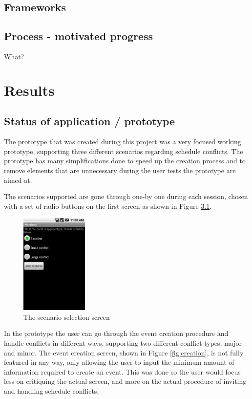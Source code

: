 \documentclass[]{report}
\begin{document}
\section{Frameworks}

\section{Process - motivated progress}

What?

\chapter{Results}

\section{Status of application / prototype}

The prototype that was created during this project was a very focused working
prototype, supporting three different scenarios regarding schedule
conflicts. The prototype has many simplifications done to speed up the creation
process and to remove elements that are unnecessary during the user tests the
prototype are aimed at.

The scenarios supported are gone through one-by one during each session, chosen
with a set of radio buttons on the first screen as shown in Figure
\ref{fig:scenario}.

\begin{figure}[htb]
  \centering
  \includegraphics[height=50mm]{scenario}
  \caption{The scenario selection screen}
  \label{fig:scenario}
\end{figure}

In the prototype the user can go through the event creation procedure and handle
conflicts in different ways, supporting two different conflict types, major and
minor. The event creation screen, shown in Figure \ref{fig:creation}, is not
fully featured in any way, only allowing the user to input the minimum amount of
information required to create an event. This was done so the user would focus
less on critiquing the actual screen, and more on the actual procedure of
inviting and handling schedule conflicts.
\end{document}
